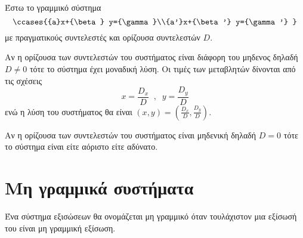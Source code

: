Έστω το γραμμικό σύστημα 
\[ \ccases{{a}x+{\beta} y={\gamma}\\{a'}x+{\beta'} y={\gamma'} } \]
με πραγματικούς συντελεστές και ορίζουσα συντελεστών $ D $.
\begin{rlist}
\item Αν η ορίζουσα των συντελεστών του συστήματος είναι διάφορη του μηδενος δηλαδή $ D\neq0 $ τότε το σύστημα έχει μοναδική λύση. Οι τιμές των μεταβλητών δίνονται από τις σχέσεις
\[ x=\frac{D_x}{D}\;\;,\;\;y=\frac{D_y}{D} \]
ενώ η λύση του συστήματος θα είναι $ (x,y)=\left(\frac{D_x}{D},\frac{D_y}{D} \right)  $.
\item Αν η ορίζουσα των συντελεστών του συστήματος είναι μηδενική δηλαδή $ D=0 $ τότε το σύστημα είναι είτε αόριστο είτε αδύνατο.
\end{rlist}
\section{Μη γραμμικά συστήματα}
\orismoi
{}
Ένα σύστημα εξισώσεων θα ονομάζεται μη γραμμικό όταν τουλάχιστον μια εξίσωσή του είναι μη γραμμική εξίσωση.\\\\